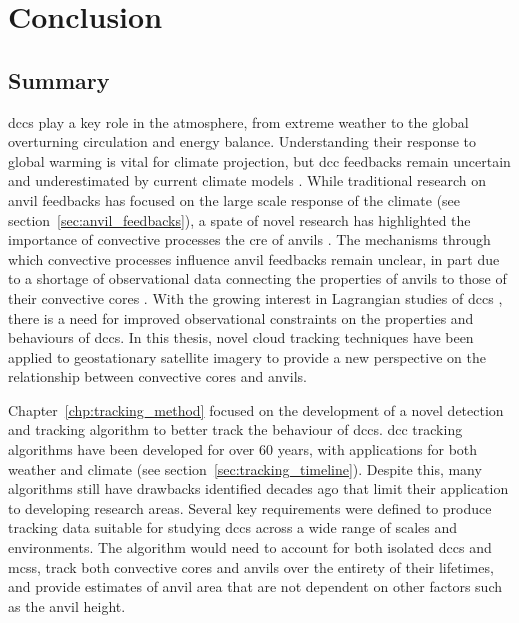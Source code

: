 \chapter{Conclusion} \label{chp:conclusion}

\section{Summary}

\acrshort{dcc}s play a key role in the atmosphere, from extreme weather to the global overturning circulation and energy balance.
Understanding their response to global warming is vital for climate projection, but \acrshort{dcc} feedbacks remain uncertain \citep{sherwood_assessment_2020} and underestimated by current climate models \citep{hill_climate_2023}.
While traditional research on anvil feedbacks has focused on the large scale response of the climate (see section~\ref{sec:anvil_feedbacks}), a spate of novel research has highlighted the importance of convective processes the \acrshort{cre} of anvils \citep{raghuraman_observational_2024, sokol_greater_2024, mckim_weak_2024}.
The mechanisms through which convective processes influence anvil feedbacks remain unclear, in part due to a shortage of observational data connecting the properties of anvils to those of their convective cores \citep{gasparini_opinion_2023}.
With the growing interest in Lagrangian studies of \acrshort{dcc}s \citep{gasparini_what_2019, sokol_tropical_2020, bouniol_life_2021}, there is a need for improved observational constraints on the properties and behaviours of \acrshort{dcc}s.
In this thesis, novel cloud tracking techniques have been applied to geostationary satellite imagery to provide a new perspective on the relationship between convective cores and anvils.

Chapter~\ref{chp:tracking_method} focused on the development of a novel detection and tracking algorithm to better track the behaviour of \acrshort{dcc}s.
\acrshort{dcc} tracking algorithms have been developed for over 60 years, with applications for both weather and climate (see section~\ref{sec:tracking_timeline}).
Despite this, many algorithms still have drawbacks identified decades ago \citep{augustine_mesoscale_1988} that limit their application to developing research areas.
Several key requirements were defined to produce tracking data suitable for studying \acrshort{dcc}s across a wide range of scales and environments.
The algorithm would need to account for both isolated \acrshort{dcc}s and \acrshort{mcs}s, track both convective cores and anvils over the entirety of their lifetimes, and provide estimates of anvil area that are not dependent on other factors such as the anvil height.

